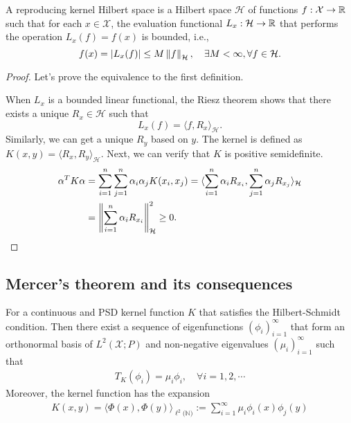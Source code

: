\begin{definition} A reproducing kernel Hilbert space is a Hilbert space $\mathcal{H}$ of functions $f: \mathcal{X} \rightarrow \mathbb{R}$ such that for each $x \in \mathcal{X}$, the evaluation functional $L_x: \mathcal{H} \rightarrow \mathbb{R}$ that performs the operation $L_x(f) = f(x)$ is bounded, i.e.,
$$
f(x) = |L_x(f)| \leq M \left\lVert f \right\rVert_\mathcal{H}, \quad \exists M < \infty,  \forall f \in \mathcal{H}.
$$
\end{definition}
\begin{proof}
Let's prove the equivalence to the first definition.

When $L_x$ is a bounded linear functional, the Riesz theorem shows that there exists a unique $R_x \in \mathcal{H}$ such that
$$
L_x(f) = \langle f, R_x \rangle_\mathcal{H}.
$$
Similarly, we can get a unique $R_y$ based on $y$. The kernel is defined as $K(x, y) = \langle R_x, R_y \rangle_\mathcal{H}$. Next, we can verify that $K$ is positive semidefinite.
\begin{align*}
    \alpha^T K \alpha & = \sum_{i=1}^n \sum_{j=1}^n \alpha_i \alpha_j K(x_i, x_j) = \langle \sum_{i=1}^n \alpha_i R_{x_i}, \sum_{j=1}^n \alpha_j R_{x_j} \rangle_\mathcal{H} \\
    & = \left\lVert \sum_{i=1}^n \alpha_i R_{x_i} \right\rVert^2_\mathcal{H} \geq 0.
\end{align*}
\end{proof}

\subsection{Mercer's theorem and its consequences}
\begin{theorem}[Mercer's]
For a continuous and PSD kernel function $K$ that satisfies the Hilbert-Schmidt condition. Then there exist a sequence of eigenfunctions $(\phi_i)_{i=1}^\infty$ that form an orthonormal basis of $L^2(\mathcal{X}; P)$ and non-negative eigenvalues $(\mu_i)_{i=1}^\infty$ such that
\begin{align}
    T_K(\phi_i) = \mu_i \phi_i, \quad \forall i=1,2,\cdots
\end{align}
Moreover, the kernel function has the expansion
\begin{align*}
    K(x, y) = \langle \Phi(x), \Phi(y) \rangle_{\ell^2(\mathbb{N)}} := \sum_{i=1}^\infty \mu_i \phi_i(x) \phi_j(y)
\end{align*}
\end{theorem}